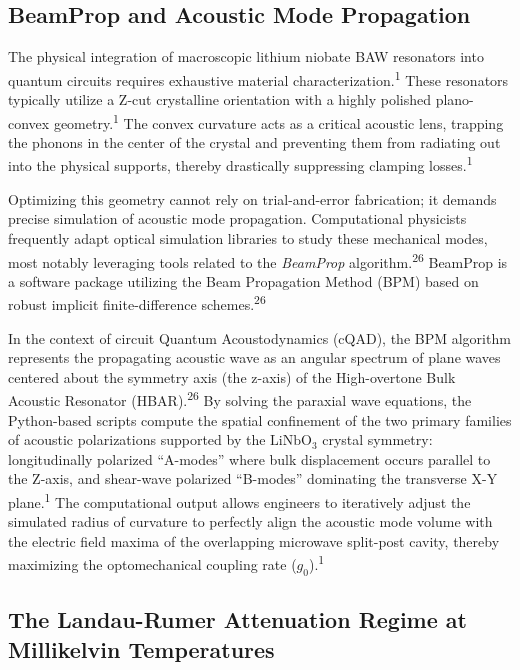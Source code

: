 \documentclass[11pt, a4paper]{article}
\begin{document}
\subsection{BeamProp and Acoustic Mode Propagation}

The physical integration of macroscopic lithium niobate BAW resonators into quantum circuits requires exhaustive material characterization.\textsuperscript{1} These resonators typically utilize a Z-cut crystalline orientation with a highly polished plano-convex geometry.\textsuperscript{1} The convex curvature acts as a critical acoustic lens, trapping the phonons in the center of the crystal and preventing them from radiating out into the physical supports, thereby drastically suppressing clamping losses.\textsuperscript{1}

Optimizing this geometry cannot rely on trial-and-error fabrication; it demands precise simulation of acoustic mode propagation. Computational physicists frequently adapt optical simulation libraries to study these mechanical modes, most notably leveraging tools related to the \textit{BeamProp} algorithm.\textsuperscript{26} BeamProp is a software package utilizing the Beam Propagation Method (BPM) based on robust implicit finite-difference schemes.\textsuperscript{26}

In the context of circuit Quantum Acoustodynamics (cQAD), the BPM algorithm represents the propagating acoustic wave as an angular spectrum of plane waves centered about the symmetry axis (the z-axis) of the High-overtone Bulk Acoustic Resonator (HBAR).\textsuperscript{26} By solving the paraxial wave equations, the Python-based scripts compute the spatial confinement of the two primary families of acoustic polarizations supported by the $\text{LiNbO}_3$ crystal symmetry: longitudinally polarized ``A-modes'' where bulk displacement occurs parallel to the Z-axis, and shear-wave polarized ``B-modes'' dominating the transverse X-Y plane.\textsuperscript{1} The computational output allows engineers to iteratively adjust the simulated radius of curvature to perfectly align the acoustic mode volume with the electric field maxima of the overlapping microwave split-post cavity, thereby maximizing the optomechanical coupling rate ($g_0$).\textsuperscript{1}

\subsection{The Landau-Rumer Attenuation Regime at Millikelvin Temperatures}
\end{document}
